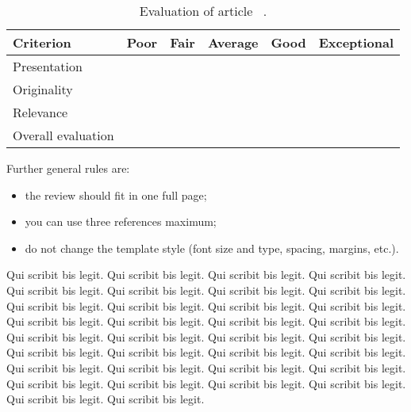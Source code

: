 \documentclass[conference]{IEEEtran}
\begin{document}
\begin{table}[h]\footnotesize
  \center
  \begin{tabular}
    { | p{.9in} | p{0.25in} | p{0.25in} | p{0.4in} | p{0.25in} | p{0.5in} |}\hline
    \textbf{Criterion} &
    \textbf{Poor} &
    \textbf{Fair} &
    \textbf{Average} &
    \textbf{Good} &
    \textbf{Exceptional} \\ \hline
    Presentation &
    &
    &
    \centering{x} &
    &
    \\ \hline
    Originality &
    &
    &
    \centering{x} &
    &
    \\ \hline    
    Relevance &
    &
    &
    \centering{x} &
    &
    \\ \hline  
    Overall evaluation &
    &
    &
    \centering{x} &
    &
    \\ \hline 
 \end{tabular}
 \caption{\footnotesize Evaluation of article~\cite{EWD:EWD447pub} .}
  \label{tab:review}
\end{table}

Further general rules are:

\begin{itemize}
 \item the review should fit in one full page;
 \item you can use three references maximum;
 \item do not change the template style (font size and type, spacing, margins, etc.).
\end{itemize}


Qui scribit bis legit. Qui scribit bis legit. Qui scribit bis legit. Qui scribit bis legit. Qui scribit bis legit. Qui scribit bis legit. Qui scribit bis legit. Qui scribit bis legit. Qui scribit bis legit. Qui scribit bis legit. Qui scribit bis legit. Qui scribit bis legit. Qui scribit bis legit. Qui scribit bis legit. Qui scribit bis legit. Qui scribit bis legit. Qui scribit bis legit. Qui scribit bis legit. Qui scribit bis legit. Qui scribit bis legit. Qui scribit bis legit. Qui scribit bis legit. Qui scribit bis legit. Qui scribit bis legit. Qui scribit bis legit. Qui scribit bis legit. Qui scribit bis legit. Qui scribit bis legit. Qui scribit bis legit. Qui scribit bis legit. Qui scribit bis legit. Qui scribit bis legit. Qui scribit bis legit. Qui scribit bis legit. 





\end{document}
